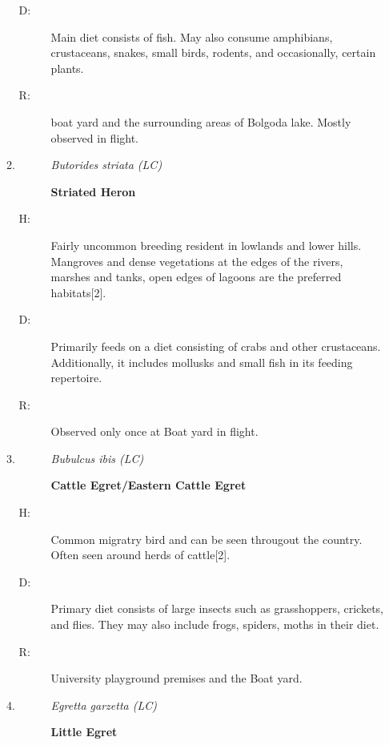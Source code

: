 \begin{itemize}
\begin{enumerate}
\begin{description}
\item[D: ]%
Main diet consists of fish. May also consume amphibians, crustaceans, snakes, small birds, rodents, and occasionally, certain plants.%
\item[R: ]%
boat yard and the surrounding areas of Bolgoda lake. Mostly observed in flight.%
\end{description}%
\item%
\begin{description}%
\item[]%
\textit{Butorides striata (LC)}%
\item[]%
\textbf{Striated Heron}%
\end{description}%
\begin{description}%
\item[H: ]%
Fairly uncommon breeding resident in lowlands and lower hills. Mangroves and dense vegetations at the edges of the rivers, marshes and tanks, open edges of lagoons are the preferred habitats{[}2{]}.%
\item[D: ]%
Primarily feeds on a diet consisting of crabs and other crustaceans. Additionally, it includes mollusks and small fish in its feeding repertoire.%
\item[R: ]%
Observed only once at Boat yard in flight.%
\end{description}%
\item%
\begin{description}%
\item[]%
\textit{Bubulcus ibis (LC)}%
\item[]%
\textbf{Cattle Egret/Eastern Cattle Egret}%
\end{description}%
\begin{description}%
\item[H: ]%
Common migratry bird and can be seen througout the country. Often seen around herds of cattle{[}2{]}.%
\item[D: ]%
Primary diet consists of large insects such as grasshoppers, crickets, and flies. They may also include frogs, spiders, moths in their diet.%
\item[R: ]%
University playground premises and the Boat yard.%
\end{description}%
\item%
\begin{description}%
\item[]%
\textit{Egretta garzetta (LC)}%
\item[]%
\textbf{Little Egret}%
\end{description}%
\begin{description}%

\end{description}
\end{enumerate}
\end{itemize}
